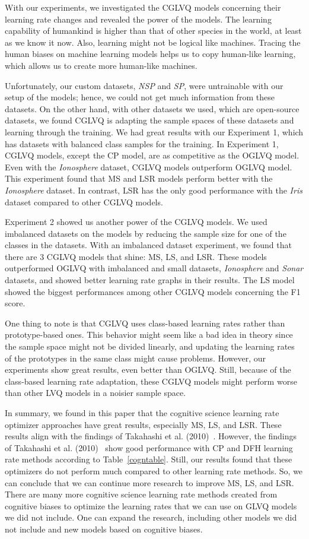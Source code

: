 With our experiments, we investigated the CGLVQ models concerning their learning rate changes and revealed the power of the models. The learning capability of humankind is higher than that of other species in the world, at least as we know it now. Also, learning might not be logical like machines. Tracing the human biases on machine learning models helps us to copy human-like learning, which allows us to create more human-like machines.

Unfortunately, our custom datasets, \textit{NSP} and \textit{SP}, were untrainable with our setup of the models; hence, we could not get much information from these datasets. On the other hand, with other datasets we used, which are open-source datasets, we found CGLVQ is adapting the sample spaces of these datasets and learning through the training. We had great results with our Experiment 1, which has datasets with balanced class samples for the training. In Experiment 1, CGLVQ models, except the CP model, are as competitive as the OGLVQ model. Even with the \textit{Ionosphere} dataset, CGLVQ models outperform OGLVQ model. This experiment found that MS and LSR models perform better with the \textit{Ionosphere} dataset. In contrast, LSR has the only good performance with the \textit{Iris} dataset compared to other CGLVQ models.


Experiment 2 showed us another power of the CGLVQ models. We used imbalanced datasets on the models by reducing the sample size for one of the classes in the datasets. With an imbalanced dataset experiment, we found that there are 3 CGLVQ models that shine: MS, LS, and LSR. These models outperformed OGLVQ with imbalanced and small datasets, \textit{Ionosphere} and \textit{Sonar} datasets, and showed better learning rate graphs in their results. The LS model showed the biggest performances among other CGLVQ models concerning the F1 score.

One thing to note is that CGLVQ uses class-based learning rates rather than prototype-based ones. This behavior might seem like a bad idea in theory since the sample space might not be divided linearly, and updating the learning rates of the prototypes in the same class might cause problems. However, our experiments show great results, even better than OGLVQ. Still, because of the class-based learning rate adaptation, these CGLVQ models might perform worse than other LVQ models in a noisier sample space.

In summary, we found in this paper that the cognitive science learning rate optimizer approaches have great results, especially MS, LS, and LSR. These results align with the findings of Takahashi et al. (2010)~\cite{cogn}. However, the findings of Takahashi et al. (2010)~\cite{cogn} show good performance with CP and DFH learning rate methods according to Table~\ref{cogntable}. Still, our results found that these optimizers do not perform much compared to other learning rate methods. So, we can conclude that we can continue more research to improve MS, LS, and LSR. There are many more cognitive science learning rate methods created from cognitive biases to optimize the learning rates that we can use on GLVQ models we did not include. One can expand the research, including other models we did not include and new models based on cognitive biases.

